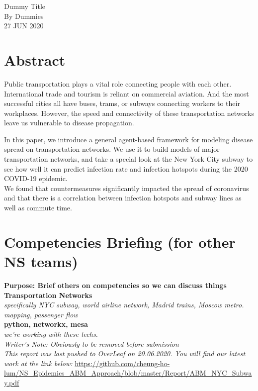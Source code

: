 \documentclass[12pt, a4, epsf] {article}
\theoremstyle{plain}
\theoremstyle{definition}
\begin{document}
\begin{center}

{\Large Dummy Title\\}
By Dummies \\
27 JUN 2020
\end{center}

\section*{Abstract}
Public transportation plays a vital role connecting people with each other. International trade and tourism is reliant on commercial aviation. And the most successful cities all have buses, trams, or subways connecting workers to their workplaces. However, the speed and connectivity of these transportation networks leave us vulnerable to disease propagation.

In this paper, we introduce a general agent-based framework for modeling disease spread on transportation networks. We use it to build models of major transportation networks, and take a special look at the New York City subway to see how well it can predict infection rate and infection hotspots during the 2020 COVID-19 epidemic.\\

We found that countermeasures significantly impacted the spread of coronavirus and that there is a correlation between infection hotspots and subway lines as well as commute time.

\section*{Competencies Briefing (for other NS teams)}
\textbf{Purpose: Brief others on competencies so we can discuss things\\}
\textbf{Transportation Networks\\}
\textit{specifically NYC subway, world airline network, Madrid trains, Moscow metro. mapping, passenger flow\\}
\textbf{python, networkx, mesa\\}
\textit{we're working with these techs.\\}
\textit{Writer's Note: Obviously to be removed before submission\\}
\textit{This report was last pushed to OverLeaf on 20.06.2020. You will find our latest work at the link below:}
\url{https://github.com/cheung-ho-lum/NS_Epidemics_ABM_Approach/blob/master/Report/ABM_NYC_Subway.pdf}
\end{document}
